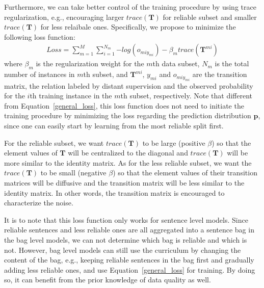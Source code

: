 Furthermore, we can take better control of the training procedure by using trace regularization, e.g., encouraging larger $trace (\mathbf{T})$ for reliable subset and smaller $trace (\mathbf{T})$ for less relaibale ones.
Specifically, we propose to minimize the following  loss function:
%
\begin{equation}
\begin{aligned}
Loss=\sum_{m=1}^M{\sum_{i=1}^{N_m}{-log(o_{miy_{mi}})}} - \beta_m trace(\mathbf{T}^{mi})
\end{aligned}
\end{equation}
where $\beta_m$ is the regularization weight for the $m$th data subset, $N_m$ is the total number of instances in $m$th subset, and  $\mathbf{T}^{mi}$, $y_{mi}$ and $o_{miy_{mi}}$ are the transition matrix, the relation labeled by distant supervision and the observed probability for the $i$th training instance in the $m$th subset, respectively. Note that different from Equation~\ref{general_loss}, this loss function does not need to initiate the training procedure by
minimizing the loss regarding the prediction distribution $\mathbf{p}$, since one can easily start by learning from the most reliable split first. 

For the reliable subset, we want $trace(\mathbf{T})$ to be large (positive $\beta$) so that the element values of $\mathbf{T}$ will be centralized to the diagonal and $trace (\mathbf{T})$ will be more similar to the identity matrix. As for the  less reliable subset, we want the $trace (\mathbf{T})$ to be small (negative $\beta$) so that the element values of their transition matrices will be diffusive and the transition matrix will be less similar to the identity matrix. In other words, the transition matrix is encouraged to characterize the noise.

It is to note that this loss function only works for sentence level models. Since reliable sentences and less reliable ones are all aggregated into a sentence bag in the bag level models,  we can not determine which bag is reliable and which is not. However, bag level models can still use the curriculum by changing the content of the bag, e.g., keeping reliable sentences in the bag first and gradually adding less reliable ones, and use Equation~\ref{general_loss} for training. By doing so, it can benefit from the prior knowledge of data quality as well.



